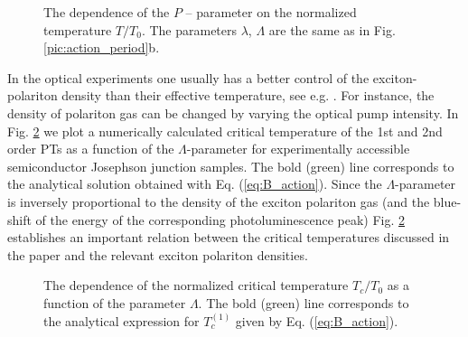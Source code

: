\documentclass[fleqn,10pt]{wlscirep}
\begin{document}
%
\begin{figure}[ht]
\caption
{The dependence of the $P$ -- parameter on the normalized temperature $T/T_{0}$.  The parameters $\lambda$, $\Lambda$ are the same as in Fig. \ref{pic:action_period}b.
\label{pic:p_parameter}}
\end{figure}
%
In the optical experiments one usually has a better control of the exciton-polariton density than their effective temperature, see e.g. \cite{Sanvitto,Guillet}.
For instance, the density of polariton gas can be changed by varying the optical pump intensity.
In Fig. \ref{pic:temperatures} we plot a numerically calculated critical temperature of the 1st and 2nd order PTs as a function of the $\Lambda$-parameter for experimentally accessible semiconductor Josephson junction samples.
The bold (green) line corresponds to the analytical solution obtained with  Eq. (\ref{eq:B_action}).
Since the $\Lambda$-parameter is inversely proportional to the density of the exciton polariton gas (and the blue-shift of the energy of the corresponding photoluminescence peak) Fig. \ref{pic:temperatures} establishes an important relation between the critical temperatures discussed in the paper and the relevant exciton polariton densities.
%
\begin{figure}[ht]
\caption
{The dependence of the normalized critical temperature $T_{c}/T_{0}$ as a function of the parameter $\Lambda$. The bold (green) line corresponds to the analytical expression for  $T_{c}^{(1)}$ given by Eq. (\ref{eq:B_action}).
\label{pic:temperatures}}
\end{figure}
%
\end{document}
